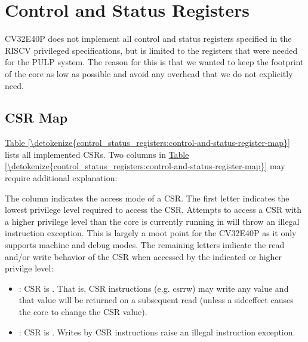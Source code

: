 \documentclass[letterpaper,10pt,english]{sphinxmanual}
\begin{document}
\sphinxstepscope


\chapter{Control and Status Registers}
\label{\detokenize{control_status_registers:control-and-status-registers}}\label{\detokenize{control_status_registers:cs-registers}}\label{\detokenize{control_status_registers::doc}}
\sphinxAtStartPar
CV32E40P does not implement all control and status registers specified in
the RISC\sphinxhyphen{}V privileged specifications, but is limited to the registers
that were needed for the PULP system. The reason for this is that we
wanted to keep the footprint of the core as low as possible and avoid
any overhead that we do not explicitly need.


\section{CSR Map}
\label{\detokenize{control_status_registers:csr-map}}
\sphinxAtStartPar
\hyperref[\detokenize{control_status_registers:control-and-status-register-map}]{Table \ref{\detokenize{control_status_registers:control-and-status-register-map}}} lists all
implemented CSRs.  Two columns in \hyperref[\detokenize{control_status_registers:control-and-status-register-map}]{Table \ref{\detokenize{control_status_registers:control-and-status-register-map}}} may require additional explanation:

\sphinxAtStartPar
The  column indicates the access mode of a CSR. The first letter
indicates the lowest privilege level required to access the CSR. Attempts to
access a CSR with a higher privilege level than the core is currently running
in will throw an illegal instruction exception.  This is largely a moot point
for the CV32E40P as it only supports machine and debug modes. The remaining
letters indicate the read and/or write behavior of the CSR when accessed by
the indicated or higher privilge level:
\begin{itemize}
\item {} 
\sphinxAtStartPar
{}: CSR is .  That is, CSR instructions (e.g. csrrw) may
write any value and that value will be returned on a subsequent read (unless
a side\sphinxhyphen{}effect causes the core to change the CSR value).

\item {} 
\sphinxAtStartPar
{}: CSR is .  Writes by CSR instructions raise an illegal
instruction exception.

\end{itemize}
\end{document}
